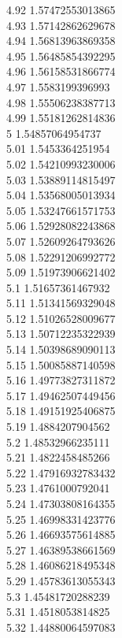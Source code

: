 {4.92	1.57472553013865\\
4.93	1.57142862629678\\
4.94	1.56813963869358\\
4.95	1.56485854392295\\
4.96	1.56158531866774\\
4.97	1.5583199396993\\
4.98	1.55506238387713\\
4.99	1.55181262814836\\
5	1.54857064954737\\
5.01	1.5453364251954\\
5.02	1.54210993230006\\
5.03	1.53889114815497\\
5.04	1.53568005013934\\
5.05	1.53247661571753\\
5.06	1.52928082243868\\
5.07	1.52609264793626\\
5.08	1.52291206992772\\
5.09	1.51973906621402\\
5.1	1.51657361467932\\
5.11	1.51341569329048\\
5.12	1.51026528009677\\
5.13	1.50712235322939\\
5.14	1.50398689090113\\
5.15	1.50085887140598\\
5.16	1.49773827311872\\
5.17	1.49462507449456\\
5.18	1.49151925406875\\
5.19	1.4884207904562\\
5.2	1.48532966235111\\
5.21	1.4822458485266\\
5.22	1.47916932783432\\
5.23	1.4761000792041\\
5.24	1.47303808164355\\
5.25	1.46998331423776\\
5.26	1.46693575614885\\
5.27	1.46389538661569\\
5.28	1.46086218495348\\
5.29	1.45783613055343\\
5.3	1.45481720288239\\
5.31	1.4518053814825\\
5.32	1.44880064597083\\
}
